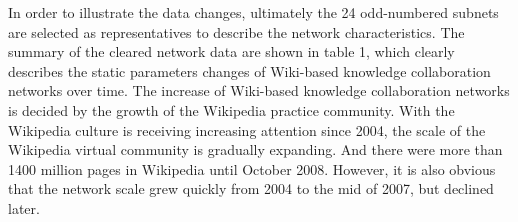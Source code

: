 \documentclass{elsarticle}
\begin{document}
In order to illustrate the data changes, ultimately the 24 odd-numbered subnets are selected as representatives to describe the network characteristics. The summary of the cleared network data are shown in table 1, which clearly describes the static parameters changes of Wiki-based knowledge collaboration networks over time. The increase of Wiki-based knowledge collaboration networks is decided by the growth of the Wikipedia practice community. With the Wikipedia culture is receiving increasing attention since 2004, the scale of the Wikipedia virtual community is gradually expanding. And there were more than 1400 million pages in Wikipedia until October 2008. However, it is also obvious that the network scale grew quickly from 2004 to the mid of 2007, but declined later.
\begin{table}[htbp]
 

\end{table}
\end{document}
